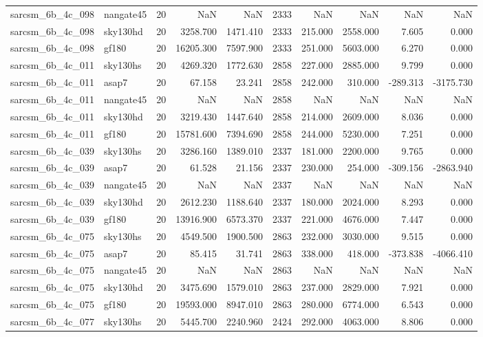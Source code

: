 \begin{tabular}{llrrrrrrrr}
sarcsm\_6b\_4c\_098 & nangate45 & 20 & NaN & NaN & 2333 & NaN & NaN & NaN & NaN \\
sarcsm\_6b\_4c\_098 & sky130hd & 20 & 3258.700 & 1471.410 & 2333 & 215.000 & 2558.000 & 7.605 & 0.000 \\
sarcsm\_6b\_4c\_098 & gf180 & 20 & 16205.300 & 7597.900 & 2333 & 251.000 & 5603.000 & 6.270 & 0.000 \\
sarcsm\_6b\_4c\_011 & sky130hs & 20 & 4269.320 & 1772.630 & 2858 & 227.000 & 2885.000 & 9.799 & 0.000 \\
sarcsm\_6b\_4c\_011 & asap7 & 20 & 67.158 & 23.241 & 2858 & 242.000 & 310.000 & -289.313 & -3175.730 \\
sarcsm\_6b\_4c\_011 & nangate45 & 20 & NaN & NaN & 2858 & NaN & NaN & NaN & NaN \\
sarcsm\_6b\_4c\_011 & sky130hd & 20 & 3219.430 & 1447.640 & 2858 & 214.000 & 2609.000 & 8.036 & 0.000 \\
sarcsm\_6b\_4c\_011 & gf180 & 20 & 15781.600 & 7394.690 & 2858 & 244.000 & 5230.000 & 7.251 & 0.000 \\
sarcsm\_6b\_4c\_039 & sky130hs & 20 & 3286.160 & 1389.010 & 2337 & 181.000 & 2200.000 & 9.765 & 0.000 \\
sarcsm\_6b\_4c\_039 & asap7 & 20 & 61.528 & 21.156 & 2337 & 230.000 & 254.000 & -309.156 & -2863.940 \\
sarcsm\_6b\_4c\_039 & nangate45 & 20 & NaN & NaN & 2337 & NaN & NaN & NaN & NaN \\
sarcsm\_6b\_4c\_039 & sky130hd & 20 & 2612.230 & 1188.640 & 2337 & 180.000 & 2024.000 & 8.293 & 0.000 \\
sarcsm\_6b\_4c\_039 & gf180 & 20 & 13916.900 & 6573.370 & 2337 & 221.000 & 4676.000 & 7.447 & 0.000 \\
sarcsm\_6b\_4c\_075 & sky130hs & 20 & 4549.500 & 1900.500 & 2863 & 232.000 & 3030.000 & 9.515 & 0.000 \\
sarcsm\_6b\_4c\_075 & asap7 & 20 & 85.415 & 31.741 & 2863 & 338.000 & 418.000 & -373.838 & -4066.410 \\
sarcsm\_6b\_4c\_075 & nangate45 & 20 & NaN & NaN & 2863 & NaN & NaN & NaN & NaN \\
sarcsm\_6b\_4c\_075 & sky130hd & 20 & 3475.690 & 1579.010 & 2863 & 237.000 & 2829.000 & 7.921 & 0.000 \\
sarcsm\_6b\_4c\_075 & gf180 & 20 & 19593.000 & 8947.010 & 2863 & 280.000 & 6774.000 & 6.543 & 0.000 \\
sarcsm\_6b\_4c\_077 & sky130hs & 20 & 5445.700 & 2240.960 & 2424 & 292.000 & 4063.000 & 8.806 & 0.000 \\

\end{tabular}
